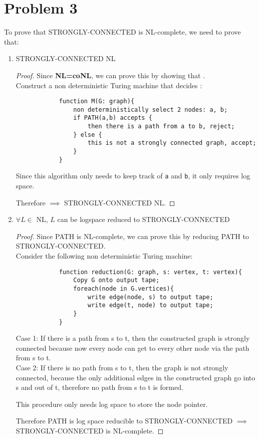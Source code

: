 \documentclass[letterpaper]{article}
\begin{document}
\section*{Problem 3}
To prove that STRONGLY-CONNECTED is NL-complete, we need to prove that:
\begin{enumerate}
    \item STRONGLY-CONNECTED \textin{} NL \begin{proof}
        Since \textbf{NL=coNL}, we can prove this by showing that  .\\
        Construct a non deterministic Turing machine that decides :
        \begin{verbatim}
            function M(G: graph){
                non deterministically select 2 nodes: a, b;
                if PATH(a,b) accepts {
                    then there is a path from a to b, reject;
                } else {
                    this is not a strongly connected graph, accept;
                }
            }
        \end{verbatim}
        Since this algorithm only needs to keep track of \verb#a# and \verb#b#, it only requires log space.

        Therefore   $\implies$ STRONGLY-CONNECTED \textin{} NL.
    \end{proof}
    \item $\forall L \in$ NL, $L$ can be logspace reduced to STRONGLY-CONNECTED \begin{proof}
        Since PATH is NL-complete, we can prove this by reducing PATH to STRONGLY-CONNECTED.\\
        Consider the following non deterministic Turing machine:
        \begin{verbatim}
            function reduction(G: graph, s: vertex, t: vertex){
                Copy G onto output tape;
                foreach(node in G.vertices){
                    write edge(node, s) to output tape;
                    write edge(t, node) to output tape;
                }
            }
        \end{verbatim}
        Case 1: If there is a path from s to t, then the constructed graph is strongly connected because 
        now every node can get to every other node via the path from s to t.\\
        Case 2: If there is no path from s to t, then the graph is not strongly connected, because 
        the only additional edges in the constructed graph go into s and out of t, therefore no path from 
        s to t is formed.

        This procedure only needs log space to store the node pointer.

        Therefore PATH is log space reducible to STRONGLY-CONNECTED $\implies$ STRONGLY-CONNECTED is NL-complete.
    \end{proof}
\end{enumerate}
\end{document}
